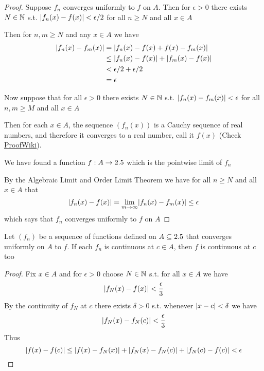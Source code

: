 \documentclass[11pt]{article}
\begin{document}
\begin{proof}
Suppose \(f_n\) converges uniformly to \(f\) on \(A\). Then for \(\epsilon>0\) there
exists \(N\in\mathbb{N}\) s.t. \(\abs{f_n(x)-f(x)}<\epsilon/2\) for all \(n\ge N\)
and all \(x\in A\)

Then for \(n,m\ge N\) and any \(x\in A\) we have
\begin{align*}
\abs{f_n(x)-f_m(x)}&=\abs{f_n(x)-f(x)+f(x)-f_m(x)}\\
&\le\abs{f_n(x)-f(x)}+\abs{f_m(x)-f(x)}\\
&<\epsilon/2+\epsilon/2\\
&=\epsilon
\end{align*}

Now suppose that for all \(\epsilon>0\) there exists \(N\in\mathbb{N}\) s.t.
\(\abs{f_n(x)-f_m(x)}<\epsilon\) for all \(n,m\ge M\) and all \(x\in A\)

Then for each \(x\in A\), the sequence \((f_n(x))\) is a Cauchy sequence of
real numbers, and therefore it converges to a real number, call it \(f(x)\)
(Check \href{https://proofwiki.org/wiki/Cauchy\_Sequence\_Converges\_on\_Real\_Number\_Line}{ProofWiki}).

We have found a function \(f:A\to2.5\) which is the pointwise limit of \(f_n\)

By the Algebraic Limit and Order Limit Theorem we have for all \(n\ge N\) and
all \(x\in A\) that
\begin{equation*}
\abs{f_n(x)-f(x)}=\lim_{m\to\infty}\abs{f_n(x)-f_m(x)}\le\epsilon
\end{equation*}
which says that \(f_n\) converges uniformly to \(f\) on \(A\)
\end{proof}

\begin{theorem}
Let \((f_n)\) be a sequence of functions defined on \(A\subseteq2.5\) that
converges uniformly on \(A\) to \(f\). If each \(f_n\) is continuous at
\(c\in A\), then \(f\) is continuous at \(c\) too
\end{theorem}

\begin{proof}
Fix \(x\in A\) and for \(\epsilon>0\) choose \(N\in\mathbb{N}\) s.t. for all \(x\in A\) we
have
\begin{equation*}
\abs{f_N(x)-f(x)}<\frac{\epsilon}{3}
\end{equation*}
By the continuity of \(f_N\) at \(c\) there exists \(\delta>0\) s.t. whenever
\(\abs{x-c}<\delta\) we have
\begin{equation*}
\abs{f_N(x)-f_N(c)}<\frac{\epsilon}{3}
\end{equation*}
Thus
\begin{equation*}
\abs{f(x)-f(c)}\le\abs{f(x)-f_N(x)}+\abs{f_N(x)-f_N(c)}+\abs{f_N(c)-f(c)}<\epsilon
\end{equation*}
\end{proof}
\end{document}
